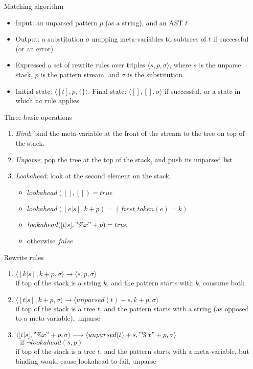 \documentclass{beamer}
\begin{document}
\begin{frame}{Matching algorithm}
\begin{itemize}
\item Input: an unparsed pattern $p$ (as a string), and an AST $t$
\item Output: a substitution $\sigma$ mapping meta-variables to subtrees of $t$ if successful (or an error)
\item Expressed a set of rewrite rules over triples $\langle s, p, \sigma \rangle$, where $s$ is the unparse stack, $p$ is the pattern stream, and $\sigma$ is the substitution
\item Initial state: $\langle [t], p, \{\} \rangle$. Final state: $\langle [], [], \sigma \rangle$ if successful, or a state in which no rule applies
\end{itemize}
\end{frame}

\begin{frame}{Three basic operations}
\begin{enumerate}
\item \emph{Bind}; bind the meta-variable at the front of the stream to
the tree on top of the stack.
\item \emph{Unparse}; pop the tree at the top of the stack, and push its
unparsed list
\item \emph{Lookahead}; look at the second element on the stack.
\begin{itemize}
\item $lookahead([], []) = true$
\item $lookahead([e|s], k + p) = (first\_token(e) = k)$
\item $lookahead([t|s], "\%x" + p) = true$
\item otherwise $false$
\end{itemize}
\end{enumerate}
\end{frame}

\begin{frame}{Rewrite rules}
\begin{enumerate}
\pause
\item $\langle [k|s], k + p, \sigma \rangle \longrightarrow \langle s, p, \sigma \rangle$ \\
if top of the stack is a string $k$, and the pattern starts with $k$,
consume both
\pause
\item $\langle [t|s], k + p, \sigma \rangle \longrightarrow \langle unparsed(t) + s, k + p, \sigma \rangle $ \\
if top of the stack is a tree $t$, and the pattern starts with a string (as
opposed to a meta-variable), unparse
\pause
\item $\langle [t|s], "\%x" + p, \sigma \rangle \longrightarrow \langle unparsed(t) + s, "\%x" + p, \sigma \rangle $ \\ $ \,\,\,\, \text{if } \neg lookahead(s, p)$ \\
if top of the stack is a tree $t$, and the pattern starts with a meta-variable, but binding would cause lookahead to fail, unparse
\end{enumerate}
\end{frame}
\end{document}
